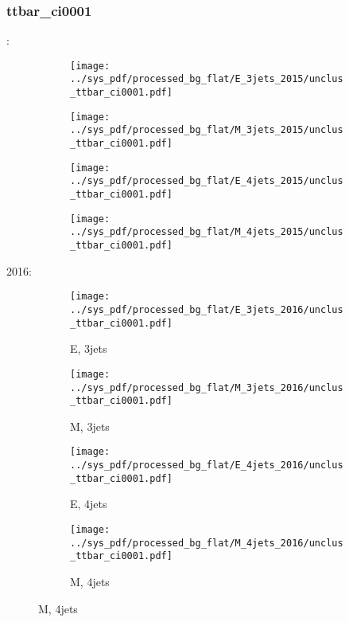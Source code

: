 \documentclass{beamer}
\begin{document}
\begin{frame}
\frametitle{ttbar_ci0001}
\fontsize{5}{1}:
\begin{figure}
\centering
\begin{subfigure}[b]{0.24\textwidth}
\texttt{[image: ../sys\_pdf/processed\_bg\_flat/E\_3jets\_2015/unclus\_ttbar\_ci0001.pdf]}
\end{subfigure}
\begin{subfigure}[b]{0.24\textwidth}
\texttt{[image: ../sys\_pdf/processed\_bg\_flat/M\_3jets\_2015/unclus\_ttbar\_ci0001.pdf]}
\end{subfigure}
\begin{subfigure}[b]{0.24\textwidth}
\texttt{[image: ../sys\_pdf/processed\_bg\_flat/E\_4jets\_2015/unclus\_ttbar\_ci0001.pdf]}
\end{subfigure}
\begin{subfigure}[b]{0.24\textwidth}
\texttt{[image: ../sys\_pdf/processed\_bg\_flat/M\_4jets\_2015/unclus\_ttbar\_ci0001.pdf]}
\end{subfigure}
\end{figure}
2016:
\begin{figure}
\centering
\begin{subfigure}[b]{0.24\textwidth}
\texttt{[image: ../sys\_pdf/processed\_bg\_flat/E\_3jets\_2016/unclus\_ttbar\_ci0001.pdf]}
\captionsetup{font=tiny}
\caption{E, 3jets}
\end{subfigure}
\begin{subfigure}[b]{0.24\textwidth}
\texttt{[image: ../sys\_pdf/processed\_bg\_flat/M\_3jets\_2016/unclus\_ttbar\_ci0001.pdf]}
\captionsetup{font=tiny}
\caption{M, 3jets}
\end{subfigure}
\begin{subfigure}[b]{0.24\textwidth}
\texttt{[image: ../sys\_pdf/processed\_bg\_flat/E\_4jets\_2016/unclus\_ttbar\_ci0001.pdf]}
\captionsetup{font=tiny}
\caption{E, 4jets}
\end{subfigure}
\begin{subfigure}[b]{0.24\textwidth}
\texttt{[image: ../sys\_pdf/processed\_bg\_flat/M\_4jets\_2016/unclus\_ttbar\_ci0001.pdf]}
\captionsetup{font=tiny}
\caption{M, 4jets}
\end{subfigure}
\end{figure}
\end{frame}
\end{document}
